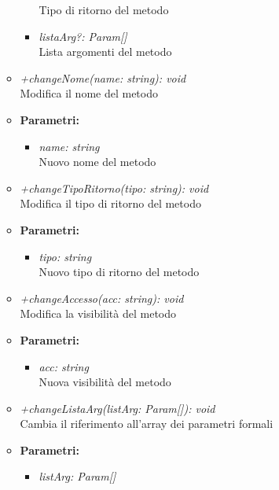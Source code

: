 \begin{itemize}
\begin{itemize}
\begin{itemize}
            					Tipo di ritorno del metodo
            					\item \emph{listaArg?: Param[]}\\
            					Lista argomenti del metodo
            				\end{itemize}
          				\item \emph{+changeNome(name: string): void}\\
          				Modifica il nome del metodo
          				\item \textbf{Parametri:}\\
            				\begin{itemize}
            					\item \emph{name: string}\\
            					Nuovo nome del metodo
            				\end{itemize}
          				\item \emph{+changeTipoRitorno(tipo: string): void}\\
          				Modifica il tipo di ritorno del metodo
          				\item \textbf{Parametri:}\\
            				\begin{itemize}
            					\item \emph{tipo: string}\\
            					Nuovo tipo di ritorno del metodo
            				\end{itemize}
          				\item \emph{+changeAccesso(acc: string): void}\\
          				Modifica la visibilità del metodo
          				\item \textbf{Parametri:}\\
            				\begin{itemize}
            					\item \emph{acc: string}\\
            					Nuova visibilità del metodo
            				\end{itemize}          				
          				\item \emph{+changeListaArg(listArg: Param[]): void}\\
          				 Cambia il riferimento all'array dei parametri formali
          				 \item \textbf{Parametri:}\\
            				\begin{itemize}
            					\item \emph{listArg: Param[]}\\

\end{itemize}
\end{itemize}
\end{itemize}
